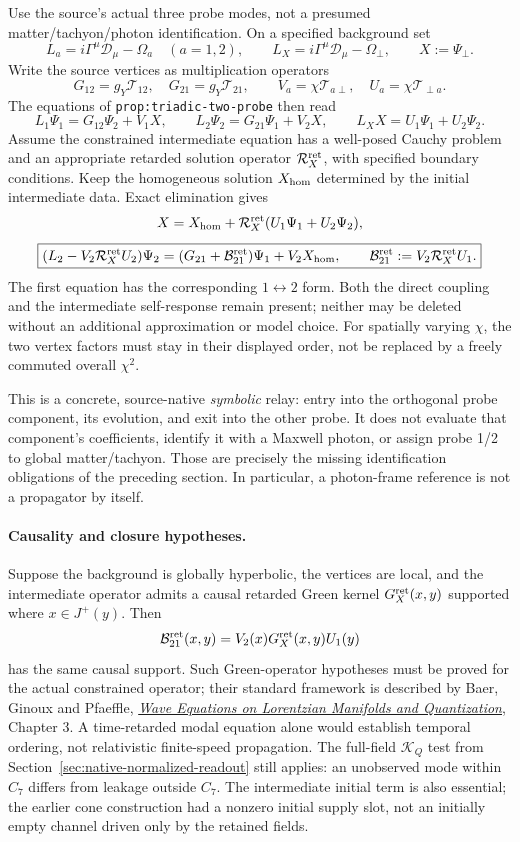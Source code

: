 \documentclass[11pt,a4paper]{article}
\begin{document}
Use the source's actual three probe modes, not a presumed
matter/tachyon/photon identification. On a specified background set
\[
 L_a=i\Gamma^\mu\mathcal D_\mu-\Omega_a\quad(a=1,2),
 \qquad L_X=i\Gamma^\mu\mathcal D_\mu-\Omega_\perp,
 \qquad X:=\Psi_\perp.
\]
Write the source vertices as multiplication operators
\[
 G_{12}=g_Y\mathcal T_{12},\quad G_{21}=g_Y\mathcal T_{21},
 \qquad V_a=\chi\mathcal T_{a\perp},\quad
 U_a=\chi\mathcal T_{\perp a}.
\]
The equations of \texttt{prop:triadic-two-probe} then read
\[
 L_1\Psi_1=G_{12}\Psi_2+V_1X,\qquad
 L_2\Psi_2=G_{21}\Psi_1+V_2X,
 \qquad L_XX=U_1\Psi_1+U_2\Psi_2.
\]
Assume the constrained intermediate equation has a well-posed
Cauchy problem and an appropriate retarded solution operator
$\mathcal R_X^{\rm ret}$, with specified boundary conditions.
Keep the homogeneous solution $X_{\rm hom}$ determined by the
initial intermediate data. Exact elimination gives
\[
 X=X_{\rm hom}+\mathcal R_X^{\rm ret}
                         (U_1\Psi_1+U_2\Psi_2),
\]
\[
 \boxed{\displaystyle
 (L_2-V_2\mathcal R_X^{\rm ret}U_2)\Psi_2
 =(G_{21}+\mathcal B_{21}^{\rm ret})\Psi_1+V_2X_{\rm hom},
 \qquad \mathcal B_{21}^{\rm ret}:=V_2\mathcal R_X^{\rm ret}U_1.}
\]
The first equation has the corresponding $1\leftrightarrow2$
form. Both the direct coupling and the intermediate self-response
remain present; neither may be deleted without an additional
approximation or model choice. For spatially varying $\chi$, the
two vertex factors must stay in their displayed order, not be
replaced by a freely commuted overall $\chi^2$.

This is a concrete, source-native \emph{symbolic} relay: entry into
the orthogonal probe component, its evolution, and exit into the
other probe. It does not evaluate that component's coefficients,
identify it with a Maxwell photon, or assign probe 1/2 to global
matter/tachyon. Those are precisely the missing identification
obligations of the preceding section. In particular, a photon-frame
reference is not a propagator by itself.

\paragraph{Causality and closure hypotheses.}
Suppose the background is globally hyperbolic, the vertices are
local, and the intermediate operator admits a causal retarded
Green kernel $G_X^{\rm ret}(x,y)$ supported where
$x\in J^+(y)$. Then
\[
 \mathcal B_{21}^{\rm ret}(x,y)
   =V_2(x)G_X^{\rm ret}(x,y)U_1(y)
\]
has the same causal support. Such Green-operator hypotheses must
be proved for the actual constrained operator; their standard
framework is described by Baer, Ginoux and Pfaeffle,
\href{https://arxiv.org/abs/0806.1036}{\emph{Wave Equations on Lorentzian
Manifolds and Quantization}}, Chapter 3. A time-retarded modal
equation alone would establish temporal ordering, not relativistic
finite-speed propagation. The full-field $\mathcal K_Q$ test from
Section~\ref{sec:native-normalized-readout} still applies: an
unobserved mode within $C_7$ differs from leakage outside $C_7$.
The intermediate initial term is also essential; the earlier cone
construction had a nonzero initial supply slot, not an initially
empty channel driven only by the retained fields.
\end{document}
